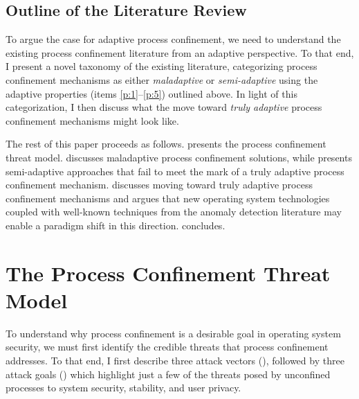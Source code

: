 \documentclass[dvipsnames, 12pt]{article}
\begin{document}
\subsection{Outline of the Literature Review}

To argue the case for adaptive process confinement, we need to understand the
existing process confinement literature from an adaptive perspective. To that
end, I present a novel taxonomy of the existing literature, categorizing process
confinement mechanisms as either \textit{maladaptive} or \textit{semi-adaptive}
using the adaptive properties (items \ref{p:1}--\ref{p:5}) outlined above.
In light of this categorization, I then discuss what the move toward
\textit{truly adaptive} process confinement mechanisms might look like.

The rest of this paper proceeds as follows.  presents the
process confinement threat model.   discusses maladaptive
process confinement solutions, while  presents
semi-adaptive approaches that fail to meet the mark of a truly adaptive process
confinement mechanism.  discusses moving toward truly adaptive
process confinement mechanisms and argues that new operating system technologies
coupled with well-known techniques from the anomaly detection literature may
enable a paradigm shift in this direction.   concludes.

\section{The Process Confinement Threat Model}
\label{sec:threat_model}

To understand why process confinement is a desirable goal in operating system
security, we must first identify the credible threats that process confinement
addresses. To that end, I first describe three attack vectors
(), followed by three attack goals ()
which highlight just a few of the threats posed by unconfined processes to
system security, stability, and user privacy.
\end{document}
